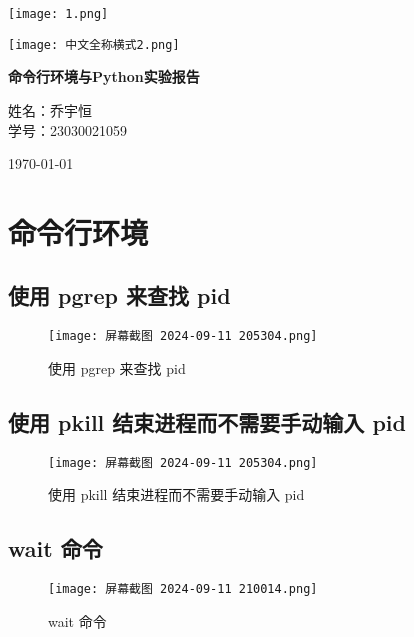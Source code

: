 \documentclass[a4paper, 12pt]{article}
\begin{document}
\begin{titlepage}
 \centering
    \texttt{[image: 1.png]}
    
    \vspace{-1.5em} %
    
    \texttt{[image: 中文全称横式2.png]}
    
    \Huge
    \textbf{命令行环境与Python实验报告} %
    
    \vspace{1in} %
    
    \Large
    \songti 
    姓名：乔宇恒
    \\学号：23030021059
    
    \vspace{1in} %
    
    \Large
    \today 
    
    \vfill %

    \thispagestyle{empty} %
\end{titlepage}

\tableofcontents
\newpage

\section{命令行环境}

\subsection{使用 pgrep 来查找 pid}
\begin{figure}[H]
    \centering
    \texttt{[image: 屏幕截图 2024-09-11 205304.png]}
    \caption{使用 pgrep 来查找 pid}
\end{figure}

\subsection{使用 pkill 结束进程而不需要手动输入 pid}
\begin{figure}[H]
    \centering
    \texttt{[image: 屏幕截图 2024-09-11 205304.png]}
    \caption{使用 pkill 结束进程而不需要手动输入 pid}

\end{figure}

\subsection{wait 命令}
\begin{figure}[H]
    \centering
    \texttt{[image: 屏幕截图 2024-09-11 210014.png]}
    \caption{wait 命令}
\end{figure}
\end{document}
